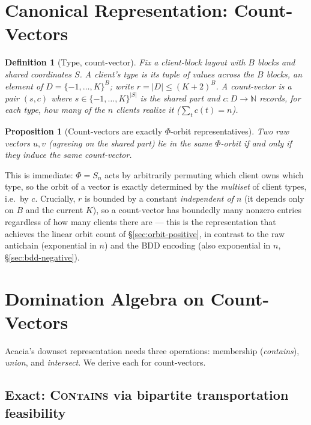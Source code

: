 \documentclass[11pt]{article}
\newtheorem{proposition}{Proposition}
\newtheorem{definition}{Definition}
\newcommand{\Phigroup}{\Phi}
\begin{document}
\section{Canonical Representation: Count-Vectors}
\label{sec:count-vectors}

\begin{definition}[Type, count-vector]
Fix a client-block layout with $B$ blocks and shared coordinates $S$. A
client's \emph{type} is its tuple of values across the $B$ blocks, an
element of $D = \{-1,\dots,K\}^B$; write $r = |D| \leq (K+2)^B$. A
\emph{count-vector} is a pair $(s, c)$ where $s \in \{-1,\dots,K\}^{|S|}$ is
the shared part and $c : D \to \mathbb N$ records, for each type, how many
of the $n$ clients realize it ($\sum_{t} c(t) = n$).
\end{definition}

\begin{proposition}[Count-vectors are exactly $\Phigroup$-orbit representatives]
Two raw vectors $u, v$ (agreeing on the shared part) lie in the same
$\Phigroup$-orbit if and only if they induce the same count-vector.
\end{proposition}

This is immediate: $\Phigroup = S_n$ acts by arbitrarily permuting which
client owns which type, so the orbit of a vector is exactly determined by
the \emph{multiset} of client types, i.e.\ by $c$. Crucially, $r$ is
bounded by a constant \emph{independent of $n$} (it depends only on $B$
and the current $K$), so a count-vector has boundedly many nonzero entries
regardless of how many clients there are --- this is the representation
that achieves the linear orbit count of \S\ref{sec:orbit-positive}, in
contrast to the raw antichain (exponential in $n$) and the BDD encoding
(also exponential in $n$, \S\ref{sec:bdd-negative}).

\section{Domination Algebra on Count-Vectors}
\label{sec:algebra}

Acacia's downset representation needs three operations: membership
(\emph{contains}), \emph{union}, and \emph{intersect}. We derive each for
count-vectors.

\subsection{Exact: \textsc{Contains} via bipartite transportation feasibility}
\end{document}

